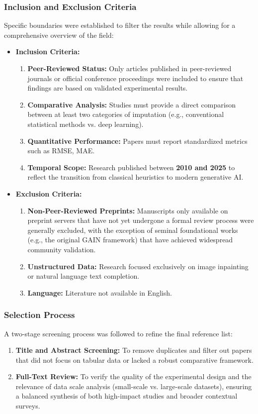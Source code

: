 \documentclass[twocolumn, 9pt]{extarticle}
\begin{document}
\subsubsection{Inclusion and Exclusion Criteria}
Specific boundaries were established to filter the results while allowing for a comprehensive overview of the field:
\begin{itemize}
    \item \textbf{Inclusion Criteria:}
    \begin{enumerate}
        \item \textbf{Peer-Reviewed Status:} Only articles published in peer-reviewed journals or official conference proceedings were included to ensure that findings are based on validated experimental results.
        \item \textbf{Comparative Analysis:} Studies must provide a direct comparison between at least two categories of imputation (e.g., conventional statistical methods vs. deep learning).
        \item \textbf{Quantitative Performance:} Papers must report standardized metrics such as RMSE, MAE.
        \item \textbf{Temporal Scope:} Research published between \textbf{2010 and 2025} to reflect the transition from classical heuristics to modern generative AI.
    \end{enumerate}
    \item \textbf{Exclusion Criteria:}
    \begin{enumerate}
        \item \textbf{Non-Peer-Reviewed Preprints:} Manuscripts only available on preprint servers that have not yet undergone a formal review process were generally excluded, with the exception of seminal foundational works (e.g., the original GAIN framework) that have achieved widespread community validation.
        \item \textbf{Unstructured Data:} Research focused exclusively on image inpainting or natural language text completion.
        \item \textbf{Language:} Literature not available in English.
    \end{enumerate}
\end{itemize}

\subsubsection{Selection Process}
A two-stage screening process was followed to refine the final reference list:
\begin{enumerate}
    \item \textbf{Title and Abstract Screening:} To remove duplicates and filter out papers that did not focus on tabular data or lacked a robust comparative framework.
    \item \textbf{Full-Text Review:} To verify the quality of the experimental design and the relevance of data scale analysis (small-scale vs. large-scale datasets), ensuring a balanced synthesis of both high-impact studies and broader contextual surveys.
\end{enumerate}
\end{document}
